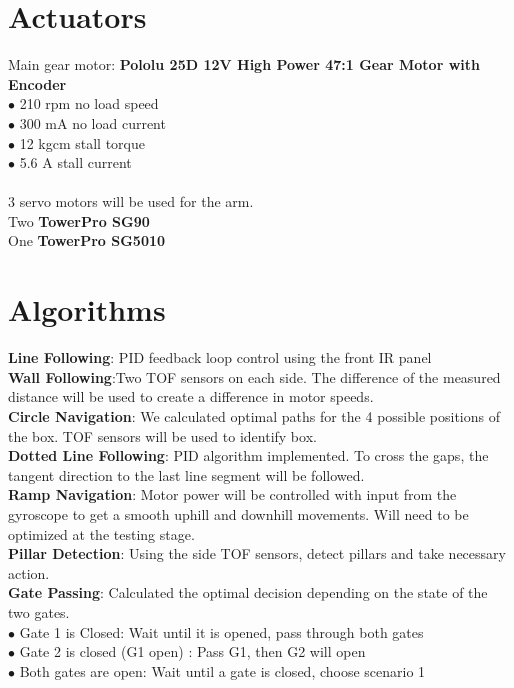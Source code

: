 \documentclass[a4paper, 12pt]{article}
\begin{document}
\section{Actuators}
Main gear motor: \textbf{Pololu 25D 12V High Power 47:1 Gear Motor with Encoder}\\
$ \bullet $ 210 rpm no load speed\\
$ \bullet $ 300 mA no load current\\
$ \bullet $ 12 kgcm stall torque\\
$ \bullet $ 5.6 A stall current\\
\\
3 servo motors will be used for the arm.\\
Two \textbf{TowerPro SG90}\\
One \textbf{TowerPro SG5010}

\section{Algorithms}
\textbf{Line Following}: PID feedback loop control using the front IR panel\\
\textbf{Wall Following}:Two TOF sensors on each side. The difference of the measured distance will be used to create a difference in motor speeds.\\
\textbf{Circle Navigation}: We calculated optimal paths for the 4 possible positions of the box. TOF sensors will be used to identify box.\\
\textbf{Dotted Line Following}: PID algorithm implemented. To cross the gaps, the tangent direction to the last line segment will be followed.\\
\textbf{Ramp Navigation}: Motor power will be controlled with input from the gyroscope to get a smooth uphill and downhill movements. Will need to be optimized at the testing stage.\\
\textbf{Pillar Detection}: Using the side TOF sensors, detect pillars and take necessary action.\\
\textbf{Gate Passing}: Calculated the optimal decision depending on the state of the two gates.\\
$ \bullet $ Gate 1 is Closed: Wait until it is opened, pass through both gates\\
$ \bullet $ Gate 2 is closed (G1 open) : Pass G1, then G2 will open\\
$ \bullet $ Both gates are open: Wait until a gate is closed, choose scenario 1\\
\end{document}
